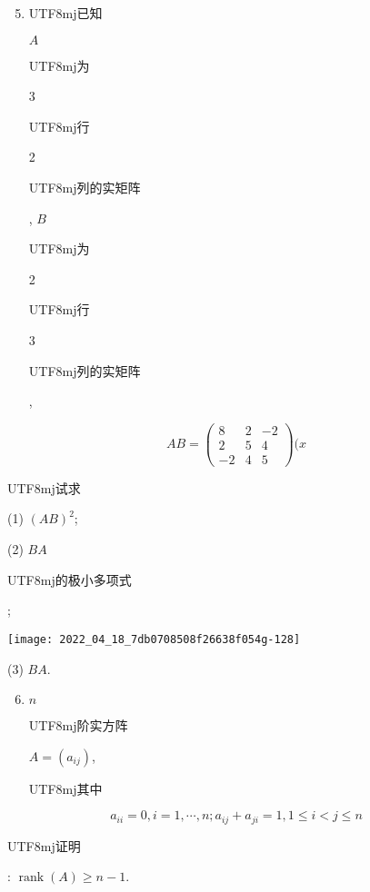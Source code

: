 \documentclass[10pt]{article}
\begin{document}
\begin{enumerate}
  \setcounter{enumi}{4}
  \item \begin{CJK}{UTF8}{mj}已知\end{CJK} $A$ \begin{CJK}{UTF8}{mj}为\end{CJK} 3 \begin{CJK}{UTF8}{mj}行\end{CJK} 2 \begin{CJK}{UTF8}{mj}列的实矩阵\end{CJK}, $B$ \begin{CJK}{UTF8}{mj}为\end{CJK} 2 \begin{CJK}{UTF8}{mj}行\end{CJK} 3 \begin{CJK}{UTF8}{mj}列的实矩阵\end{CJK},
\end{enumerate}
$$
A B=\left(\begin{array}{ccc}
8 & 2 & -2 \\
2 & 5 & 4 \\
-2 & 4 & 5
\end{array}\right)(x
$$
\begin{CJK}{UTF8}{mj}试求\end{CJK}

(1) $(A B)^{2}$;

(2) $B A$ \begin{CJK}{UTF8}{mj}的极小多项式\end{CJK};

\texttt{[image: 2022\_04\_18\_7db0708508f26638f054g-128]}

(3) $B A$.

\begin{enumerate}
  \setcounter{enumi}{5}
  \item $n$ \begin{CJK}{UTF8}{mj}阶实方阵\end{CJK} $A=\left(a_{i j}\right)$, \begin{CJK}{UTF8}{mj}其中\end{CJK}
\end{enumerate}
$$
a_{i i}=0, i=1, \cdots, n ; a_{i j}+a_{j i}=1,1 \leqslant i<j \leqslant n
$$
\begin{CJK}{UTF8}{mj}证明\end{CJK}: $\operatorname{rank}(A) \geqslant n-1$.
\end{document}
